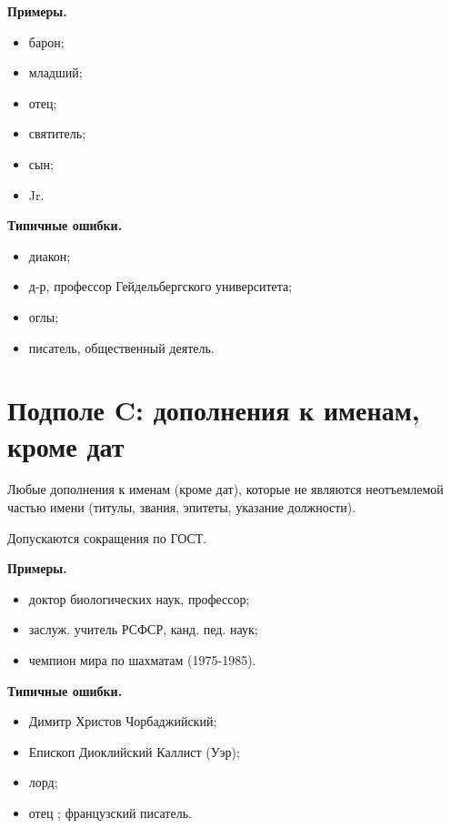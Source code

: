 \textbf{Примеры.}

\begin{itemize}
    \item барон;
    \item младший;
    \item отец;
    \item святитель;
    \item сын;
    \item Jr.
\end{itemize}

\textbf{Типичные ошибки.}

\begin{itemize}
    \item диакон;
    \item д-р, профессор Гейдельбергского университета;
    \item оглы;
    \item писатель, общественный деятель.
\end{itemize}

\section{Подполе C: дополнения к именам, кроме дат}

Любые дополнения к именам (кроме дат), которые не являются неотъемлемой частью имени (титулы, звания, эпитеты, указание должности).

Допускаются сокращения по ГОСТ.

\textbf{Примеры.}

\begin{itemize}
    \item доктор биологических наук, профессор;
    \item заслуж. учитель РСФСР, канд. пед. наук;
    \item чемпион мира по шахматам (1975-1985).
\end{itemize}

\textbf{Типичные ошибки.}

\begin{itemize}
    \item Димитр Христов Чорбаджийский;
    \item Епископ Диоклийский Каллист (Уэр);
    \item лорд;
    \item отец ; французский писатель.
\end{itemize}


